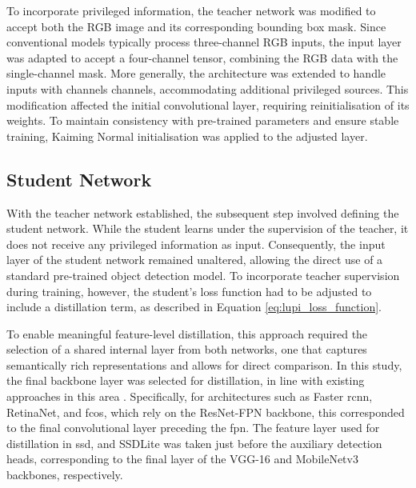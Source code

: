 To incorporate privileged information, the teacher network was modified to accept both the RGB image and its corresponding bounding box mask. Since conventional models typically process three-channel RGB inputs, the input layer was adapted to accept a four-channel tensor, combining the RGB data with the single-channel mask. More generally, the architecture was extended to handle inputs with \gls{channels} channels, accommodating additional privileged sources. This modification affected the initial convolutional layer, requiring reinitialisation of its weights. To maintain consistency with pre-trained parameters and ensure stable training, Kaiming Normal initialisation \cite{kaiming} was applied to the adjusted layer.

\subsection{Student Network}
\label{subsec:4_student}

With the teacher network established, the subsequent step involved defining the student network. While the student learns under the supervision of the teacher, it does not receive any privileged information as input. Consequently, the input layer of the student network remained unaltered, allowing the direct use of a standard pre-trained object detection model. To incorporate teacher supervision during training, however, the student’s loss function had to be adjusted to include a distillation term, as described in Equation \ref{eq:lupi_loss_function}. 

To enable meaningful feature-level distillation, this approach required the selection of a shared internal layer from both networks, one that captures semantically rich representations and allows for direct comparison. In this study, the final backbone layer was selected for distillation, in line with existing approaches in this area \cite{lab2wild, lupi_distillation, distillation2}. Specifically, for architectures such as Faster \gls{rcnn}, RetinaNet, and \gls{fcos}, which rely on the ResNet-FPN backbone, this corresponded to the final convolutional layer preceding the \gls{fpn}. The feature layer used for distillation in \gls{ssd}, and SSDLite was taken just before the auxiliary detection heads, corresponding to the final layer of the VGG-16 and MobileNetv3 backbones, respectively.

